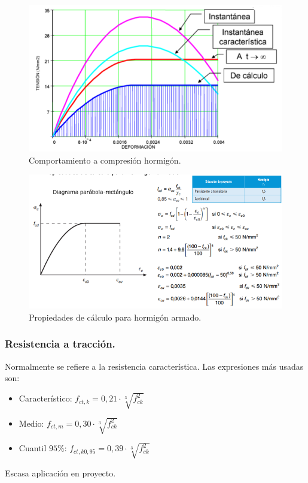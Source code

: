 \begin{figure}[H]
    \centering
    \includegraphics[width = 0.5 \textwidth]{Imagenes/Comportamiento a compresion hormigon.png}
    \caption{Comportamiento a compresión hormigón.}
\end{figure}


\begin{figure}[H]
    \centering
    \includegraphics[width = 0.5 \textwidth]{Imagenes/Propiedades de calculo para hormigon armado.png}
    \caption{Propiedades de cálculo para hormigón armado.}
\end{figure}

\subsubsection{Resistencia a tracción.}
Normalmente se refiere a la resistencia característica. Las expresiones más usadas son:
\begin{itemize}
    \item Característico: $f_{ct, k} = 0,21 \cdot \sqrt[3]{f_{ck}^2}$
    \item Medio: $f_{ct, m} = 0,30 \cdot \sqrt[3]{f_{ck}^2}$
    \item Cuantil $95\%$: $f_{ct, k 0,95} = 0,39 \cdot \sqrt[3]{f_{ck}^2}$
\end{itemize}
Escasa aplicación en proyecto.

